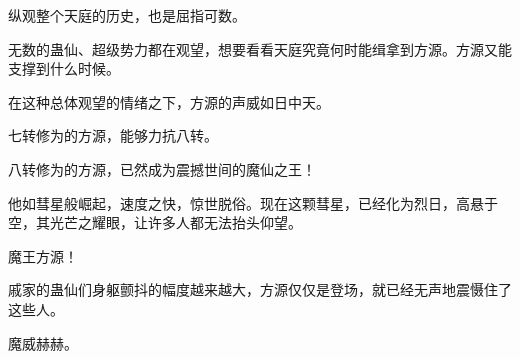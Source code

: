 \begin{this_body}
纵观整个天庭的历史，也是屈指可数。

无数的蛊仙、超级势力都在观望，想要看看天庭究竟何时能缉拿到方源。方源又能支撑到什么时候。

在这种总体观望的情绪之下，方源的声威如日中天。

七转修为的方源，能够力抗八转。

八转修为的方源，已然成为震撼世间的魔仙之王！

他如彗星般崛起，速度之快，惊世脱俗。现在这颗彗星，已经化为烈日，高悬于空，其光芒之耀眼，让许多人都无法抬头仰望。

魔王方源！

戚家的蛊仙们身躯颤抖的幅度越来越大，方源仅仅是登场，就已经无声地震慑住了这些人。

魔威赫赫。

\end{this_body}

